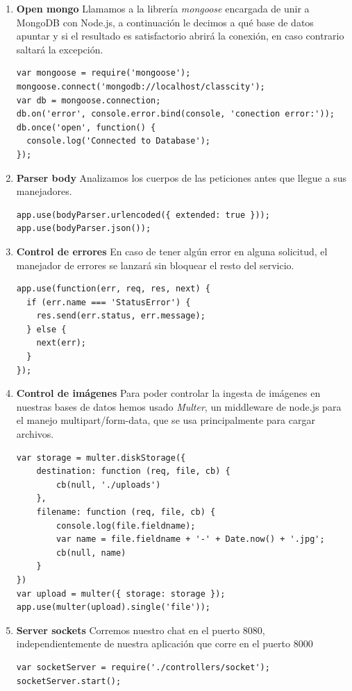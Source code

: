 \begin{enumerate}
    \item \textbf{Open mongo} Llamamos a la librería \textit{mongoose} encargada de unir a MongoDB con Node.js, a continuación le decimos a qué base de datos apuntar y si el resultado es satisfactorio abrirá la conexión, en caso contrario saltará la excepción.
\begin{lstlisting}
var mongoose = require('mongoose');
mongoose.connect('mongodb://localhost/classcity');
var db = mongoose.connection;
db.on('error', console.error.bind(console, 'conection error:'));
db.once('open', function() {
  console.log('Connected to Database');
});
\end{lstlisting}
    \item \textbf{Parser body} Analizamos los cuerpos de las peticiones antes que llegue a sus manejadores.
\begin{lstlisting}
app.use(bodyParser.urlencoded({ extended: true }));
app.use(bodyParser.json());
\end{lstlisting}
    \item \textbf{Control de errores} En caso de tener algún error en alguna solicitud, el manejador de errores se lanzará sin bloquear el resto del servicio.
\begin{lstlisting}
app.use(function(err, req, res, next) {
  if (err.name === 'StatusError') {
    res.send(err.status, err.message);
  } else {
    next(err);
  }
});
\end{lstlisting}
    \item \textbf{Control de imágenes} Para poder controlar la ingesta de imágenes en nuestras bases de datos hemos usado \textit{Multer}, un middleware de node.js para el manejo multipart/form-data, que se usa principalmente para cargar archivos.
    \begin{lstlisting}
var storage = multer.diskStorage({
    destination: function (req, file, cb) {
        cb(null, './uploads')
    },
    filename: function (req, file, cb) {
        console.log(file.fieldname);
        var name = file.fieldname + '-' + Date.now() + '.jpg';
        cb(null, name)
    }
})
var upload = multer({ storage: storage });
app.use(multer(upload).single('file'));
    \end{lstlisting}
    \item \textbf{Server sockets} Corremos nuestro chat en el puerto 8080, independientemente de nuestra aplicación que corre en el puerto 8000

\begin{lstlisting}
var socketServer = require('./controllers/socket');
socketServer.start();
\end{lstlisting}


\end{enumerate}
